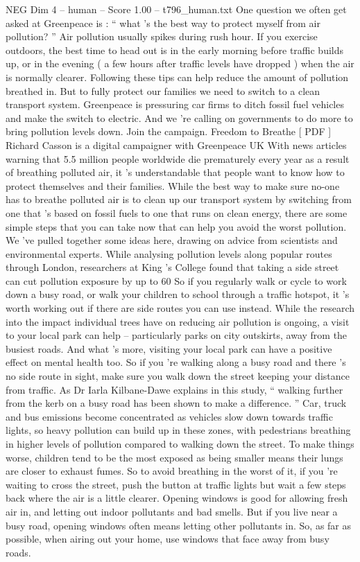 \begin{textsample}{NEG Dim 4 – human – Score 1.00 – t796\_human.txt}  \label{ex:f4_neg_048}
One question we often get asked at Greenpeace is : “ what ’s the best way to protect myself from air pollution? ” Air pollution usually spikes during rush hour.
If you exercise outdoors, the best time to head out is in the early morning before traffic builds up, or in the evening ( a few hours after traffic levels have dropped ) when the air is normally clearer.
Following these tips can help reduce the amount of pollution breathed in.
But to fully protect our families we need to switch to a clean transport system.
Greenpeace is pressuring car firms to ditch fossil fuel vehicles and make the switch to electric.
And we ’re calling on governments to do more to bring pollution levels down.
Join the campaign.
Freedom to Breathe [ PDF ] Richard Casson is a digital campaigner with Greenpeace UK With news articles warning that 5.5 million people worldwide die prematurely every year as a result of breathing polluted air, it ’s understandable that people want to know how to protect themselves and their families.
While the best way to make sure no-one has to breathe polluted air is to clean up our transport system by switching from one that ’s based on fossil fuels to one that runs on clean energy, there are some simple steps that you can take now that can help you avoid the worst pollution.
We ’ve pulled together some ideas here, drawing on advice from scientists and environmental experts.
While analysing pollution levels along popular routes through London, researchers at King ’s College found that taking a side street can cut pollution exposure by up to 60 %
So if you regularly walk or cycle to work down a busy road, or walk your children to school through a traffic hotspot, it ’s worth working out if there are side routes you can use instead.
While the research into the impact individual trees have on reducing air pollution is ongoing, a visit to your local park can help – particularly parks on city outskirts, away from the busiest roads.
And what ’s more, visiting your local park can have a positive effect on mental health too.
So if you ’re walking along a busy road and there ’s no side route in sight, make sure you walk down the street keeping your distance from traffic.
As Dr Iarla Kilbane-Dawe explains in this study, “ walking further from the kerb on a busy road has been shown to make a difference. ” Car, truck and bus emissions become concentrated as vehicles slow down towards traffic lights, so heavy pollution can build up in these zones, with pedestrians breathing in higher levels of pollution compared to walking down the street.
To make things worse, children tend to be the most exposed as being smaller means their lungs are closer to exhaust fumes.
So to avoid breathing in the worst of it, if you ’re waiting to cross the street, push the button at traffic lights but wait a few steps back where the air is a little clearer.
Opening windows is good for allowing fresh air in, and letting out indoor pollutants and bad smells.
But if you live near a busy road, opening windows often means letting other pollutants in.
So, as far as possible, when airing out your home, use windows that face away from busy roads.

\end{textsample}
